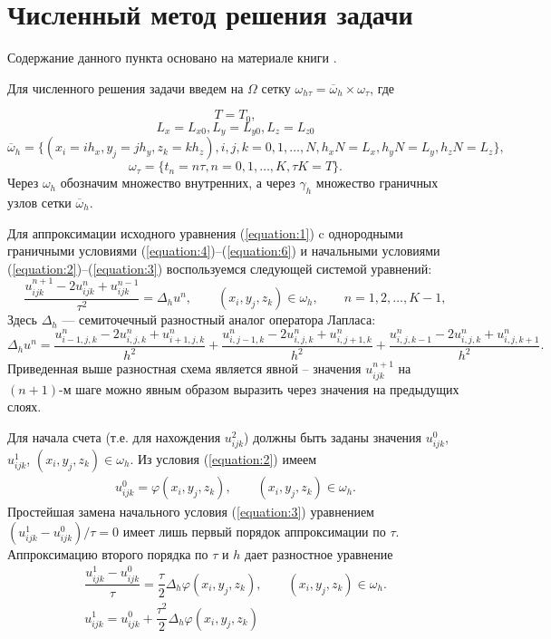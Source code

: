 \section{Численный метод решения задачи}
\label{sec:Chapter2} 
Содержание данного пункта основано на материале книги \cite{Chymi}.

Для численного решения задачи введем на $\Omega$ сетку $\omega_{h\tau} = \overline{\omega}_h \times \omega_\tau$, где

\[
    T = T_0,
\]
\[
    L_x = L_{x0}, L_y = L_{y0}, L_z = L_{z0}
\]
\[
    \overline{\omega}_h = \{\left(x_i=ih_x, y_j=jh_y, z_k=kh_z\right), i,j,k=0,1,\dots,N, h_xN=L_x,h_yN=L_y,h_zN=L_z\},
\]
\[
    \omega_\tau = \{t_n=n\tau,n=0,1,\dots,K,\tau K=T\}.
\]
Через $\omega_{h}$ обозначим множество внутренних, а через $\gamma_{h}$ множество граничных узлов сетки $\overline{\omega}_{h}$.

Для аппроксимации исходного уравнения (\ref{equation:1}) c однородными граничными условиями (\ref{equation:4})--(\ref{equation:6}) и начальными условиями (\ref{equation:2})--(\ref{equation:3}) воспользуемся следующей системой уравнений:
\[
    \frac{
        u^{n+1}_{ijk}
        -
        2 u^{n}_{ijk}
        +
        u^{n-1}_{ijk}
    }
    {
        \tau^2
    }
    =
    \Delta_h u^{n},
    \qquad
    (x_i,y_j,z_k)\in \omega_h,
    \qquad
    n = 1,2,\dots,K-1,
\]
Здесь \(\Delta_h\) — семиточечный разностный аналог оператора Лапласа:
\[
\Delta_h u^{n}
=
\frac{
        u^{n}_{i-1,j,k}
        -
        2u^{n}_{i,j,k}
        +
        u^{n}_{i+1,j,k}
    }
    {h^2}
+
\frac{
        u^{n}_{i,j-1,k}
        -
        2u^{n}_{i,j,k}
        +
        u^{n}_{i,j+1,k}
    }
    {h^2}
+
\frac{
        u^{n}_{i,j,k-1}
        -
        2u^{n}_{i,j,k}
        +
        u^{n}_{i,j,k+1}
    }
    {h^2}.
\]
Приведенная выше разностная схема является явной -- значения \(u^{n+1}_{ijk}\) на \((n+1)\)-м шаге можно явным образом выразить через значения на предыдущих слоях.

Для начала счета (т.е. для нахождения \(u^{2}_{ijk}\)) должны быть заданы значения \(u^{0}_{ijk}\), \(u^{1}_{ijk}\), \((x_i,y_j,z_k) \in \omega_{h}\).
Из условия (\ref{equation:2}) имеем
\begin{align}
    u^{0}_{ijk}
    =
    \varphi(x_i,y_j,z_k),
    \qquad
    (x_i,y_j,z_k) \in \omega_{h}.
    \label{equation:10}
\end{align}
Простейшая замена начального условия (\ref{equation:3}) уравнением \((u^{1}_{ijk}-u^{0}_{ijk})/\tau=0\) имеет лишь первый порядок аппроксимации по \(\tau\).
Аппроксимацию второго порядка по \(\tau\) и \(h\) дает разностное уравнение
\begin{align}
    \dfrac{u^{1}_{ijk}-u^{0}_{ijk}}{\tau}
    =
    \dfrac{\tau}{2}\Delta_h\varphi(x_i,y_j,z_k),
    \qquad
    (x_i,y_j,z_k) \in \omega_{h}.
    \label{equation:11}
    \\
    u^{1}_{ijk}
    =
    u^{0}_{ijk}+\dfrac{\tau^2}{2}\Delta_h\varphi(x_i,y_j,z_k)
    \label{equation:12}
\end{align}

